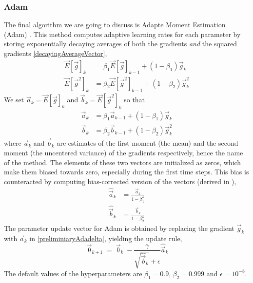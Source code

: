 \documentclass[twoside,english]{uiofysmaster}
\begin{document}
\subsubsection{Adam}
The final algorithm we are going to discuss is Adapte Moment Estimation (Adam) \cite{Kingma14}. This method
computes adaptive learning rates for each parameter by storing 
exponentially decaying averages of both the gradients \textit{and} 
the squared gradients \eqref{decayingAverageVector},
\begin{equation}
 \begin{aligned}
  \vec{E}[\vec{g}]_k &= \beta_1 \vec{E}[\vec{g}]_{k-1} + (1 - \beta_1) \vec{g}_k \\
  \vec{E}[\vec{g}^2]_k &= \beta_2  \vec{E}[\vec{g}^2]_{k-1} + (1 - \beta_2) \vec{g}^2_k
 \end{aligned}
\end{equation}
We set $\vec{a}_k = \vec{E}[\vec{g}]_k$ and $\vec{b}_k = \vec{E}[\vec{g}^2]_k$ so that
\begin{equation}
 \begin{aligned}
 \vec{a}_k &= \beta_1 \vec{a}_{k-1} + (1 - \beta_1) \vec{g}_k \\
 \vec{b}_k &= \beta_2 \vec{b}_{k-1} + (1 - \beta_2) \vec{g}^2_k
 \end{aligned}
\end{equation}
where $\vec{a}_k$ and $\vec{b}_k$ are estimates of the first moment (the mean) and the second moment (the uncentered variance)
of the gradients respectively, hence the name of the method. The elements of these two vectors are initialized as zeros, 
which make them biased towards zero, especially during the first time steps. This bias is counteracted by
computing bias-corrected version of the vectors (derived in \cite{Kingma14}),
\begin{equation}
 \begin{aligned}
 \hat{\vec{a}}_k &= \frac{\vec{a}_k}{1 - \beta_1^k} \\
 \hat{\vec{b}}_k &= \frac{\vec{b}_k}{1 - \beta_2^k}
 \end{aligned}
\end{equation}
The parameter update vector for Adam is obtained by replacing the gradient $\vec{g}_k$ with $\vec{a}_k$ in \eqref{preliminiaryAdadelta},
yielding the update rule,
\begin{equation}
 \vec{\uptheta}_{k+1} = \vec{\uptheta}_k - \frac{\gamma}{\sqrt{\hat{\vec{b}}_k} + \epsilon} \hat{\vec{a}}_k
 \label{adamUpdateRule}
\end{equation}
The default values of the hyperparameters are $\beta_1 = 0.9$, $\beta_2 = 0.999$ and $\epsilon = 10^{-8}$. 
\end{document}
